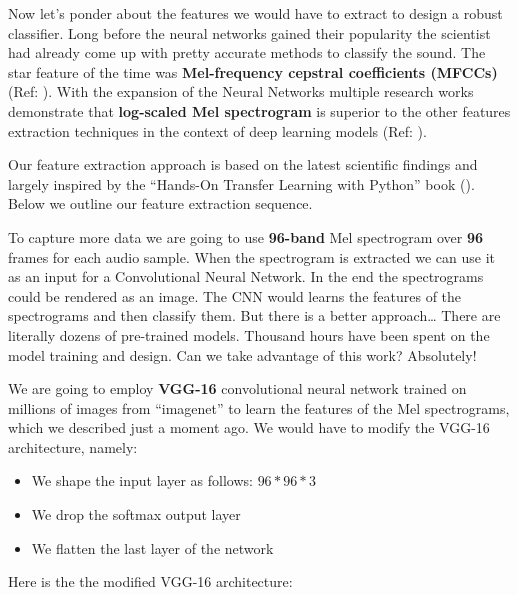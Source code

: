 Now let's ponder about the features we would have to extract to design a
robust classifier. Long before the neural networks gained their
popularity the scientist had already come up with pretty accurate
methods to classify the sound. The star feature of the time was
\textbf{Mel-frequency cepstral coefficients (MFCCs)} (Ref:
\cite{mfccmodel}). With the expansion of the Neural Networks multiple
research works demonstrate that \textbf{log-scaled Mel spectrogram} is
superior to the other features extraction techniques in the context of
deep learning models (Ref: \cite{audiosignal}).

Our feature extraction approach is based on the latest scientific
findings and largely inspired by the ``Hands-On Transfer Learning with
Python'' book (\cite{transfer}). Below we outline our feature extraction
sequence.

To capture more data we are going to use \textbf{96-band} Mel
spectrogram over \textbf{96} frames for each audio sample. When the
spectrogram is extracted we can use it as an input for a Convolutional
Neural Network. In the end the spectrograms could be rendered as an
image. The CNN would learns the features of the spectrograms and then
classify them. But there is a better approach\ldots{} There are
literally dozens of pre-trained models. Thousand hours have been spent
on the model training and design. Can we take advantage of this work?
Absolutely!

We are going to employ \textbf{VGG-16} convolutional neural network
trained on millions of images from ``imagenet'' to learn the features of
the Mel spectrograms, which we described just a moment ago. We would
have to modify the VGG-16 architecture, namely:

\begin{itemize}
\tightlist
\item
  We shape the input layer as follows: \({96} * {96} * {3}\)
\item
  We drop the softmax output layer
\item
  We flatten the last layer of the network
\end{itemize}

Here is the the modified VGG-16 architecture:


